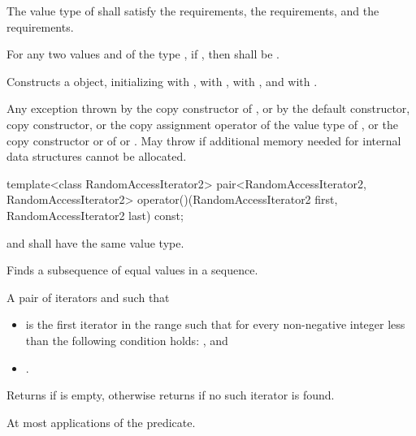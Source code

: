 \begin{itemdescr}
\pnum
\requires
The value type of  shall satisfy the  requirements,
the  requirements, and the  requirements.

\pnum
\requires
For any two values  and  of the type ,
if , then  shall be .

\pnum
\effects
Constructs a  object, initializing  with ,
 with ,  with , and  with .

\pnum
\throws
Any exception thrown by the copy constructor of ,
or by the default constructor, copy constructor, or the copy assignment operator of the value type of ,
or the copy constructor or  of  or .
May throw  if additional memory needed for internal data structures cannot be allocated.
\end{itemdescr}

%
\begin{itemdecl}
template<class RandomAccessIterator2>
  pair<RandomAccessIterator2, RandomAccessIterator2>
    operator()(RandomAccessIterator2 first, RandomAccessIterator2 last) const;
\end{itemdecl}

\begin{itemdescr}
\pnum
\requires
{} and  shall have the same value type.

\pnum
\effects
Finds a subsequence of equal values in a sequence.

\pnum
\returns
A pair of iterators  and  such that
\begin{itemize}
\item {} is the first iterator
in the range  such that
for every non-negative integer  less than 
the following condition holds:
, and
\item {}.
\end{itemize}
Returns  if  is empty,
otherwise returns  if no such iterator is found.

\pnum
\complexity
At most  applications of the predicate.
\end{itemdescr}

